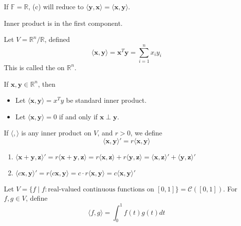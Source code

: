 \begin{note}[1]
    If $\mathbb{F} = \mathbb{R}$, (c) will reduce to $\langle \mathbf{y}, \mathbf{x} \rangle = \langle \mathbf{x}, \mathbf{y} \rangle$.
\end{note}

\begin{note}[2]
    Inner product is  in the first component.
\end{note}

\begin{definition}
    Let $V = \mathbb{R}^n / \mathbb{R}$, defined 
    \[
        \langle \mathbf{x}, \mathbf{y} \rangle = \mathbf{x}^T \mathbf{y} = \sum_{i=1}^{n} x_i y_i    
    \]
    This is called the  on $\mathbb{R}^n$.
\end{definition}

\begin{proposition}
    If $\mathbf{x}, \mathbf{y} \in \mathbb{R}^n$, then
    \begin{itemize}
        \item Let $\langle \mathbf{x}, \mathbf{y} \rangle = x^Ty$ be standard inner product.
        \item Let $\langle \mathbf{x}, \mathbf{y} \rangle = 0$ if and only if $\mathbf{x} \perp \mathbf{y}$.
    \end{itemize}
\end{proposition}

\begin{eg}
    If $\langle , \rangle$ is any inner product on $V$, and $r > 0$, we define \[
        \langle \mathbf{x},\mathbf{y} \rangle' = r \langle \mathbf{x}, \mathbf{y} \rangle
    \]
    \begin{enumerate}[label=$\arabic*^\circ$]
        \item $\langle \mathbf{x} + \mathbf{y}, \mathbf{z} \rangle' = r \langle \mathbf{x} + \mathbf{y}, \mathbf{z} \rangle = r \langle \mathbf{x}, \mathbf{z} \rangle + r \langle \mathbf{y}, \mathbf{z} \rangle = \langle \mathbf{x}, \mathbf{z} \rangle' + \langle \mathbf{y}, \mathbf{z} \rangle'$
        \item $\langle c\mathbf{x}, \mathbf{y} \rangle' = r \langle c\mathbf{x}, \mathbf{y} \rangle = c \cdot r \langle \mathbf{x}, \mathbf{y} \rangle = c \langle \mathbf{x}, \mathbf{y} \rangle'$
    \end{enumerate}
\end{eg}

\begin{eg}
    Let $V = \{ f \mid f: \text{real-valued continuous functions on } [0,1] \} = \mathcal{C}([0,1])$. For $f, g \in V$, define
    \[
        \langle f, g \rangle = \int_0^1 f(t) g(t) dt
    \]
\end{eg}

